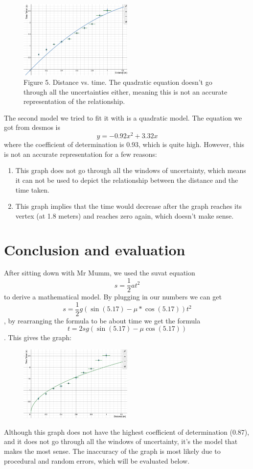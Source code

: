 \documentclass[12pt]{report}
\begin{document}
\begin{figure}
    \centering
    \includegraphics[width=0.5\textwidth]{graph2.png}
    \caption{Figure 5. Distance vs. time. The quadratic equation doesn’t go through all the uncertainties either, meaning this is not an accurate representation of the relationship.  }
\end{figure}
The second model we tried to fit it with is a quadratic model. The equation we got from desmos is \[y = -0.92x^2 + 3.32x\]
where the coefficient of determination is 0.93, which is quite high. However, this is not an accurate representation for a few reasons:
\begin{enumerate}
    \item This graph does not go through all the windows of uncertainty, which means it can not be used to depict the relationship between the distance and the time taken.
    \item This graph implies that the time would decrease after the graph reaches its vertex (at 1.8 meters) and reaches zero again, which doesn't make sense.
\end{enumerate}
\section{Conclusion and evaluation}
After sitting down with Mr Mumm, we used the suvat equation \[s = \frac{1}{2}at^2\] to derive a mathematical model. By plugging in our numbers we can get \[s = \frac{1}{2}g(\sin(5.17) - \mu*\cos(5.17)) t^2\], by rearranging the formula to be about time we get the formula \[t =2sg(\sin(5.17)-\mu \cos(5.17))\]. This gives the graph:
\begin{figure}
    \centering
    \includegraphics[width=0.5\textwidth]{graph3.png}
\end{figure}
Although this graph does not have the highest coefficient of determination (0.87), and it does not go through all the windows of uncertainty, it’s the model that makes the most sense. The inaccuracy of the graph is most likely due to procedural and random errors, which will be evaluated below.
\end{document}
